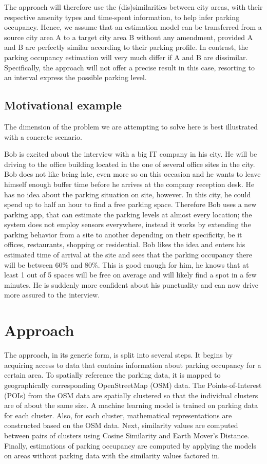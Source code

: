 \documentclass{article}
\begin{document}
	The approach will therefore use the (dis)similarities between city areas, with their respective amenity types and time-spent information, to help infer parking occupancy. Hence, we assume that an estimation model can be transferred from a source city area A to a target city area B without any amendment, provided A and B are perfectly similar according to their parking profile. In contrast, the parking occupancy estimation will very much differ if A and B are dissimilar. Specifically, the approach will not offer a precise result in this case, resorting to an interval express the possible parking level.
	 
	\subsection{Motivational example}
	The dimension of the problem we are attempting to solve here is best illustrated with a concrete scenario.
	
	Bob is excited about the interview with a big IT company in his city. He will be driving to the office building located in the one of several office sites in the city. Bob does not like being late, even more so on this occasion and he wants to leave himself enough buffer time before he arrives at the company reception desk. He has no idea about the parking situation on site, however. In this city, he could spend up to half an hour to find a free parking space. Therefore Bob uses a new parking app, that can estimate the parking levels at almost every location; the system does not employ sensors everywhere, instead it works by extending the parking behavior from a site to another depending on their specificity, be it offices, restaurants, shopping or residential. Bob likes the idea and enters his estimated time of arrival at the site and sees that the parking occupancy there will be between 60\% and 80\%. This is good enough for him, he knows that at least 1 out of 5 spaces will be free on average and will likely find a spot in a few minutes. He is suddenly more confident about his punctuality and can now drive more assured to the interview. 
		
	\section{Approach}
	The approach, in its generic form, is split into several steps. It begins by acquiring access to data that contains information about parking occupancy for a certain area. To spatially reference the parking data, it is mapped to geographically corresponding OpenStreetMap (OSM) data. The Points-of-Interest (POIs) from the OSM data are spatially clustered so that the individual clusters are of about the same size. A machine learning model is trained on parking data for each cluster. Also, for each cluster, mathematical representations are constructed based on the OSM data. Next, similarity values are computed between pairs of clusters using Cosine Similarity and Earth Mover's Distance. Finally, estimations of parking occupancy are computed by applying the models on areas without parking data with the similarity values factored in.   
	
\end{document}
